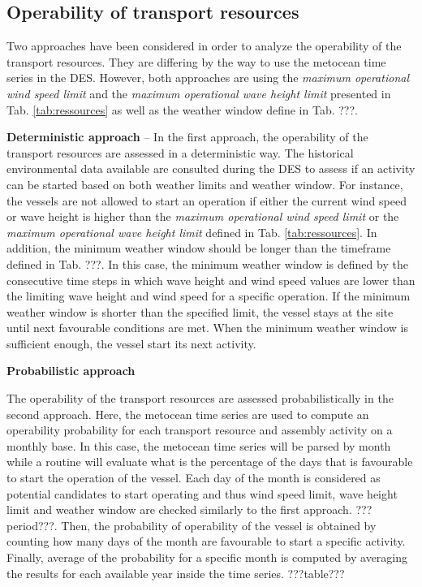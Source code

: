 \subsection{Operability of transport resources}
Two approaches have been considered in order to analyze the operability of the transport resources. They are differing by the way to use the metocean time series in the DES. However, both approaches are using the \textit{maximum operational wind speed limit} and the \textit{maximum operational wave height limit} presented in Tab. \ref{tab:ressources} as well as the weather window define in Tab. ???.

\textbf{Deterministic approach} -- In the first approach, the operability of the transport resources are assessed in a deterministic way. The historical environmental data available are consulted during the DES to assess if an activity can be started based on both weather limits and weather window. For instance, the vessels are not allowed to start an operation if either the current wind speed or wave height is higher than the \textit{maximum operational wind speed limit} or the \textit{maximum operational wave height limit} defined in Tab. \ref{tab:ressources}. In addition, the minimum weather window should be longer than the timeframe defined in Tab. ???. In this case, the minimum weather window is defined by the consecutive time steps in which wave height and wind speed values are lower than the limiting wave height and wind speed for a specific operation. If the minimum weather window is shorter than the specified limit, the vessel stays at the site until next favourable conditions are met. When the minimum weather window is sufficient enough, the vessel start its next activity. 

\textbf{Probabilistic approach}

The operability of the transport resources are assessed probabilistically in the second approach. Here, the metocean time series are used to compute an operability probability for each transport resource and assembly activity on a monthly base. In this case, the metocean time series will be parsed by month while a routine will evaluate what is the percentage of the days that is favourable to start the operation of the vessel. Each day of the month is considered as potential candidates to start operating and thus wind speed limit, wave height limit and weather window are checked similarly to the first approach. ???period???. Then, the probability of operability of the vessel is obtained by counting how many days of the month are favourable to start a specific activity. Finally, average of the probability for a specific month is computed by averaging the results for each available year inside the time series. ???table???

